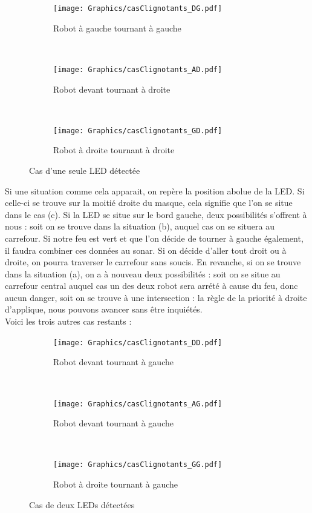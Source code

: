 \begin{itemize}
					\begin{figure}[H]
						\centering
						\begin{subfigure}[h]{0.2\textwidth}
					        \texttt{[image: Graphics/casClignotants\_DG.pdf]}
					        \caption{Robot à gauche tournant à gauche}
					    \end{subfigure}
					    ~
						\begin{subfigure}[h]{0.35\textwidth}
					        \texttt{[image: Graphics/casClignotants\_AD.pdf]}
					        \caption{Robot devant tournant à droite}
					    \end{subfigure}
					    ~
					    \begin{subfigure}[h]{0.2\textwidth}
					        \texttt{[image: Graphics/casClignotants\_GD.pdf]}
					        \caption{Robot à droite tournant à droite}
					    \end{subfigure}
					    \caption{Cas d'une seule LED détectée}
					\end{figure}
					Si une situation comme cela apparait, on repère la position abolue de la LED. Si celle-ci se trouve sur la moitié droite du masque, cela signifie que l'on se situe dans le cas (c). Si la LED se situe sur le bord gauche, deux possibilités s'offrent à nous : soit on se trouve dans la situation (b), auquel cas on se situera au carrefour. Si notre feu est vert et que l'on décide de tourner à gauche également, il faudra combiner ces données au sonar. Si on décide d'aller tout droit ou à droite, on pourra traverser le carrefour sans soucis. En revanche, si on se trouve dans la situation (a), on a à nouveau deux possibilités : soit on se situe au carrefour central auquel cas un des deux robot sera arrété à cause du feu, donc aucun danger, soit on se trouve à une intersection : la règle de la priorité à droite d'applique, nous pouvons avancer sans être inquiétés.
					\\
					Voici les trois autres cas restants :
					\begin{figure}[H]
						\centering
						\begin{subfigure}[h]{0.2\textwidth}
					        \texttt{[image: Graphics/casClignotants\_DD.pdf]}
					        \caption{Robot devant tournant à gauche}
					    \end{subfigure}
					    ~
						\begin{subfigure}[h]{0.35\textwidth}
					        \texttt{[image: Graphics/casClignotants\_AG.pdf]}
					        \caption{Robot devant tournant à gauche}
					    \end{subfigure}
					    ~
					    \begin{subfigure}[h]{0.2\textwidth}
					        \texttt{[image: Graphics/casClignotants\_GG.pdf]}
					        \caption{Robot à droite tournant à gauche}
					    \end{subfigure}
					    \caption{Cas de deux LEDs détectées}
					\end{figure}


\end{itemize}
